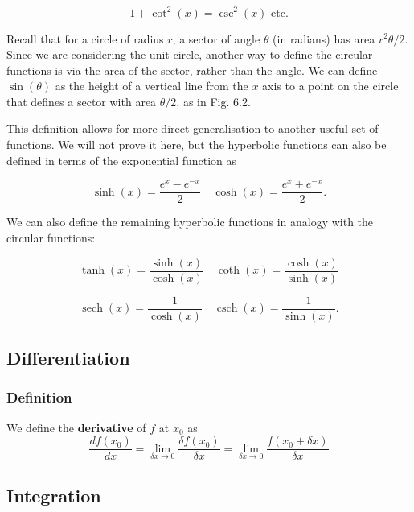 \documentclass[11pt,titlepage]{article}
\numberwithin{equation}{section}
\begin{document}
\begin{equation}
1+\cot^{2}(x)=\csc^{2}(x) \text{ etc.}
\end{equation}

Recall that for a circle of radius $r$, a sector of angle $\theta$ (in radians) has area $r^{2}\theta/2$. Since we are considering the unit circle, another way to define the circular functions is via the area of the sector, rather than the angle. We can define $\sin(\theta)$ as the height of a vertical line from the $x$ axis to a point on the circle that defines a sector with area $\theta/2$, as in Fig. 6.2.

This definition allows for more direct generalisation to another useful set of functions.
We will not prove it here, but the hyperbolic functions can also be defined in terms of the exponential function as

\begin{equation}
\sinh(x) = \frac{e^{x} - e^{-x}}{2} \quad \cosh(x) = \frac{e^{x} + e^{-x}}{2}.
\end{equation}

We can also define the remaining hyperbolic functions in analogy with the circular functions:

\begin{equation}
\tanh(x) = \frac{\sinh(x)}{\cosh(x)} \quad \coth(x) = \frac{\cosh(x)}{\sinh(x)}
\end{equation}

\begin{equation}
\operatorname{sech}(x) = \frac{1}{\cosh(x)} \quad \operatorname{csch}(x) = \frac{1}{\sinh(x)}.
\end{equation}

\subsection{Differentiation}
\subsubsection{Definition}
We define the \textbf{derivative} of $f$ at $x_0$ as 
\begin{equation}
    \frac{df(x_0)}{dx}=\lim_{\delta x\rightarrow 0}\frac{\delta f(x_0)}{\delta x}=\lim_{\delta x\rightarrow 0}\frac{f(x_0+\delta x)}{\delta x}
\end{equation}
\subsection{Integration}
\end{document}
